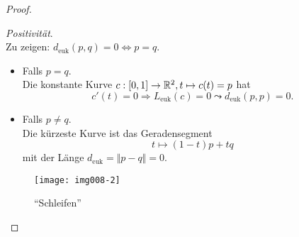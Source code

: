 \begin{theorem}
\begin{proof}
\begin{itemize}
      \begin{minipage}{.45\textwidth}
        \item \emph{Positivität}. \\
          Zu zeigen: $ d_\text{euk}(p,q) = 0 \Leftrightarrow p = q $.
          \begin{itemize}
            \item Falls $ p = q $. \\
              Die konstante Kurve $ c: [0,1] \to \mathbb{R}^2, t \mapsto c(t) = p $ hat 
              \begin{equation*}
                c'(t) = 0 \Rightarrow L_\text{euk}(c) = 0 \leadsto d_\text{euk}(p,p) = 0 \text{.}
              \end{equation*}
            \item Falls $ p \neq q $. \\
              Die kürzeste Kurve ist das Geradensegment\footnotemark
              \begin{equation*}
                t \mapsto (1-t)p + tq
              \end{equation*}
              mit der Länge $ d_\text{euk} = \Vert p - q \Vert = 0 $.
          \end{itemize}
      \end{minipage}
      \hfill
      \begin{minipage}{.45\textwidth}
        \begin{figure}[H]
          \label{img008-1}
          \texttt{[image: img008-2]}
          \caption{``Schleifen''}
        \end{figure}
      \end{minipage}
    \end{itemize}
  \end{proof}
\end{theorem}

